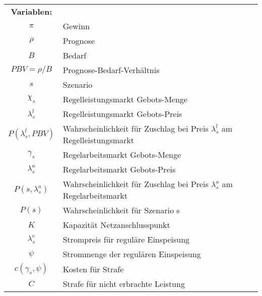 \documentclass[british,         %
BCOR=2mm,                       %
11pt,                           %
a4paper,						%
oneside,						%
cdgeometry,                     %
toc=chapterentrydotfill,        %
toc=indent,                     %
bibliography=totoc,         	%
listof=totoc,                   %
numbers=noenddot,				%
parskip=full,                   %
cdmath=false					%
]{article}                  %
\begin{document}
\begin{tabular}{ c l }
	\textbf{Variablen:}    &                                                                                \\
	$\pi$                  & Gewinn                                                                         \\
	$ \rho $               & Prognose                                                                       \\
	$ B  $                 & Bedarf                                                                         \\
	$ PBV = \rho / B$      & Prognose-Bedarf-Verhältnis                                                     \\
	$ s $                  & Szenario                                                                       \\
	$ \chi_s $             & Regelleistungsmarkt Gebots-Menge                                               \\
	$\lambda_s^l$          & Regelleistungsmarkt Gebots-Preis                                               \\
	$ P(\lambda_s^l, PBV)$ & Wahrscheinlichkeit für Zuschlag bei Preis $\lambda_s^l$ am Regelleistungsmarkt \\
	$ \gamma_s  $          & Regelarbeitsmarkt Gebots-Menge                                                 \\
	$ \lambda_s^a  $       & Regelarbeitsmarkt Gebots-Preis                                                 \\
	$ P(s, \lambda_s^a)$   & Wahrscheinlichkeit für Zuschlag bei Preis $\lambda_s^a$ am Regelarbeitsmarkt   \\
	$ P(s) $               & Wahrscheinlichkeit für Szenario s                                              \\
	$ K $                  & Kapazität Netzanschlusspunkt                                                   \\
	$ \lambda_s^e $        & Strompreis für reguläre Einspeisung                                            \\
	$ \psi $               & Strommenge der regulären Einspeisung                                           \\
	$ c(\gamma_s, \psi)$   & Kosten für Strafe                                                              \\
	$ C $                  & Strafe für nicht erbrachte Leistung                                            \\
\end{tabular}\\
\end{document}
